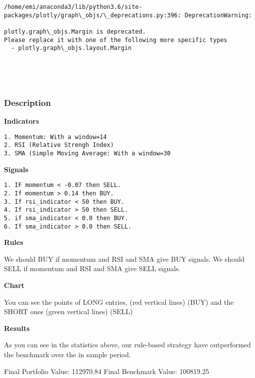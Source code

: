 \documentclass[11pt]{article}
\begin{document}
    \begin{Verbatim}[commandchars=\\\{\}]
/home/emi/anaconda3/lib/python3.6/site-packages/plotly/graph\_objs/\_deprecations.py:396: DeprecationWarning:

plotly.graph\_objs.Margin is deprecated.
Please replace it with one of the following more specific types
  - plotly.graph\_objs.layout.Margin



    \end{Verbatim}

    \begin{center}
    \end{center}
    { \hspace*{\fill} \\}
    
    \subsubsection{Description}\label{description}

\textbf{Indicators}

\begin{verbatim}
1. Momentum: With a window=14
2. RSI (Relative Strengh Index)  
3. SMA (Simple Moving Average: With a window=30
\end{verbatim}

\textbf{Signals}

\begin{verbatim}
1. IF momentum < -0.07 then SELL.
2. If momentum > 0.14 then BUY.
3. If rsi_indicator < 50 then BUY.
4. If rsi_indicator > 50 then SELL.
5. if sma_indicator < 0.0 then BUY.
6. If sma_indicator > 0.0 then SELL.
\end{verbatim}

\textbf{Rules}

We should BUY if momentum and RSI and SMA give BUY signals. We should
SELL if momentum and RSI and SMA give SELL signals.

\textbf{Chart}

You can see the points of LONG entries, (red vertical lines) (BUY) and
the SHORT ones (green vertical lines) (SELL)

\textbf{Results}

As you can see in the statistics above, our rule-based strategy have
outperformed the benchmark over the in sample period.

Final Portfolio Value: 112970.84 Final Benchmark Value: 100819.25
\end{document}
